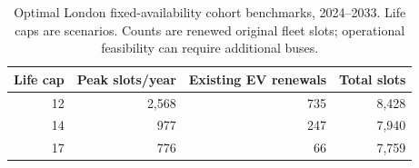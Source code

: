 \begin{table}[htbp]
\centering
\begin{tabular}{@{}rrrr@{}}
\toprule
Life cap & Peak slots/year & Existing EV renewals & Total slots\\
\midrule
12 & 2,568 & 735 & 8,428\\
14 & 977 & 247 & 7,940\\
17 & 776 & 66 & 7,759\\
\bottomrule
\end{tabular}
\caption{Optimal London fixed-availability cohort benchmarks, 2024--2033. Life caps are scenarios. Counts are renewed original fleet slots; operational feasibility can require additional buses.}
\end{table}

